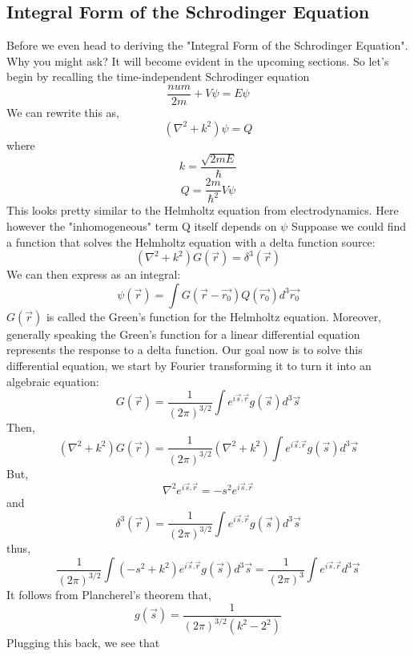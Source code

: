 \subsection{Integral Form of the Schrodinger Equation}
Before we even head to deriving the "Integral Form of the Schrodinger Equation". Why you might ask? It will become evident in the upcoming sections. So let's begin by recalling the time-independent Schrodinger equation
\begin{equation}
\frac{num}{2m} + V \psi = E \psi
\end{equation}
We can rewrite this as,
\begin{equation}
(\nabla^{2} + k^{2}) \psi = Q
\end{equation}
where
$$k = \frac{\sqrt{2mE}}{\hbar}$$
$$Q = \frac{2m}{\hbar^{2}}V \psi$$
This looks pretty similar to the Helmholtz equation from electrodynamics. Here however the "inhomogeneous" term Q itself depends on $\psi$
Suppoase we could find a function that solves the Helmholtz equation with a delta function source:
\begin{equation}
(\nabla^{2} + k^{2}) G(\vec{r}) = \delta^{3}(\vec{r})
\end{equation}
We can then express as an integral:
\begin{equation}
	\psi(\vec{r}) = \int G(\vec{r} - \vec{r_{0}}) Q(\vec{r_{0}}) d^{3}\vec{r_{0}}
\end{equation}
$G(\vec{r})$ is called the Green's function for the Helmholtz equation. Moreover, generally speaking the Green's function for a linear differential equation represents the response to a delta function. Our goal now is to solve this differential equation, we start by Fourier transforming it to turn it into an algebraic equation:
\begin{equation}
G(\vec{r}) = \frac{1}{{(2 \pi )}^{3/2}} \int e^{i \vec{s}. \vec{r}} g(\vec{s}) d^{3}\vec{s}
\end{equation}
Then,
$$(\nabla^{2} + k^{2}) G(\vec{r}) = \frac{1}{{(2 \pi)}^{3/2}} (\nabla^{2} + k^{2})\int e^{i \vec{s}. \vec{r}} g(\vec{s}) d^{3}\vec{s}$$
But,
$$\nabla^{2}e^{i \vec{s}. \vec{r}} = -s^{2}e^{i \vec{s}. \vec{r}}$$
and
$$\delta^{3}(\vec{r}) = \frac{1}{{(2 \pi )}^{3/2}} \int e^{i \vec{s}. \vec{r}} g(\vec{s}) d^{3}\vec{s}$$
thus,
$$\frac{1}{{(2 \pi)}^{3/2}} \int (-s^{2} + k^{2}) e^{i \vec{s}. \vec{r}} g(\vec{s}) d^{3}\vec{s} = \frac{1}{{(2 \pi)}^{3}} \int e^{i \vec{s}. \vec{r}} d^{3}\vec{s}$$
It follows from Plancherel's theorem that,
$$g(\vec{s}) = \frac{1}{{(2 \pi)}^{3/2}(k^{2} - 2^{2})}$$
Plugging this back, we see that
